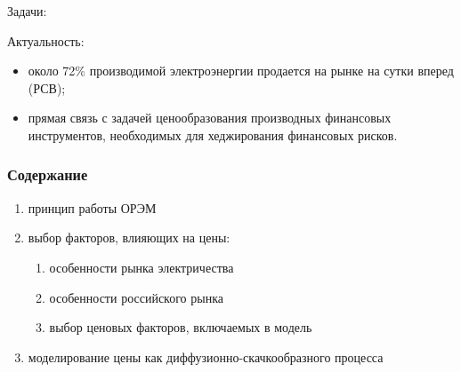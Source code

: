 \documentclass[c, dvipsnames]{beamer}  %
\begin{document}
\begin{frame}[shrink=3]
\begin{block}{Задачи:}
\begin{itemize}

		
	\end{itemize}
	
\end{block}

\begin{block}{Актуальность:}
	\begin{itemize}
		
		\item около 72\% производимой электроэнергии продается на рынке на сутки вперед (РСВ);
		\item прямая связь с задачей ценообразования производных финансовых инструментов, необходимых для хеджирования  финансовых рисков. 
		
		
	\end{itemize}
\end{block}


\end{frame}


\begin{frame}[shrink=5]



\frametitle{Содержание} 


\begin{enumerate}
	\item принцип работы ОРЭМ
	\item выбор факторов, влияющих на цены:
	\begin{enumerate}
		\item особенности рынка электричества
		\item особенности российского рынка
		\item выбор ценовых факторов, включаемых в модель
	\end{enumerate}
	\item моделирование цены как диффузионно-скачкообразного процесса  
\end{enumerate}



\end{frame}
\end{document}
